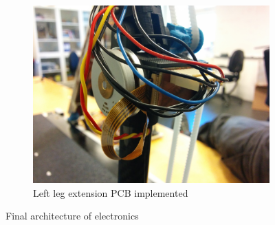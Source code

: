 \begin{figure}[ht]
\begin{subfigure}[b]{0.4\textwidth}
    \includegraphics[width=\textwidth]{figures/photo_electronics_detail.jpg}
    \caption{Left leg extension PCB implemented}
    \label{fig:pcb2}
  \end{subfigure}
  \caption{Final architecture of electronics}
\end{figure}

